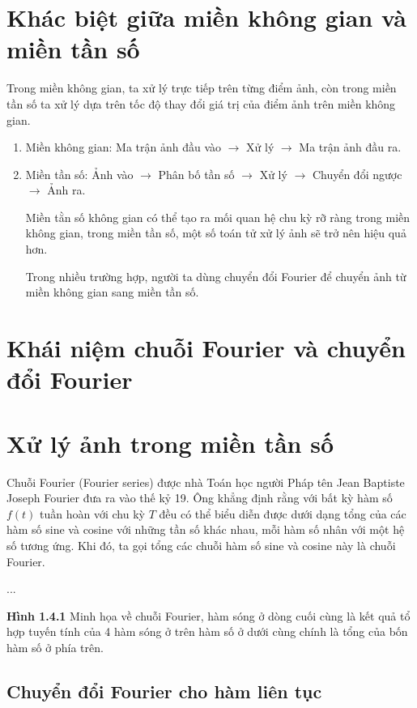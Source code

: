 \documentclass[12pt,a4paper]{report}
\numberwithin{equation}{section}
\theoremstyle{definition} %
\begin{document}
\section{Khác biệt giữa miền không gian và miền tần số}
Trong miền không gian, ta xử lý trực tiếp trên từng điểm ảnh, còn trong miền tần số ta xử lý dựa trên tốc độ thay đổi giá trị của điểm ảnh trên miền không gian.

\begin{enumerate}
    \item Miền không gian: Ma trận ảnh đầu vào $\rightarrow$ Xử lý $\rightarrow$ Ma trận ảnh đầu ra.

    \item Miền tần số: Ảnh vào $\rightarrow$ Phân bố tần số $\rightarrow$ Xử lý $\rightarrow$ Chuyển đổi ngược $\rightarrow$ Ảnh ra.

    Miền tằn số không gian có thể tạo ra mối quan hệ chu kỳ rỡ ràng trong miền không gian, trong miền tần số, một số toán tử xử lý ảnh sẽ trở nên hiệu quả hơn.

    Trong nhiều trường hợp, người ta dùng chuyển đổi Fourier để chuyển ảnh từ miền không gian sang miền tần số.
\end{enumerate}
\section{Khái niệm chuỗi Fourier và chuyển đổi Fourier}
\section{Xử lý ảnh trong miền tần số}
     Chuỗi Fourỉer (Fourier series) được nhà Toán học người Pháp tên Jean Baptiste Joseph Fourier đưa ra vào thế kỷ 19. Ông khẳng định rằng với bất kỳ hàm số $f(t)$ tuần hoàn với chu kỳ $T$ đều có thể biểu diễn được dưới dạng tổng của các hàm số sine và cosine với những tần số khác nhau, mỗi hàm số nhân với một hệ số tương ứng. Khi đó, ta gọi tổng các chuỗi hàm số sine và cosine này là chuỗi Fourier.

    ...

    \textbf{Hình 1.4.1} Minh họa về chuỗi Fourier, hàm sóng ở dòng cuối cùng là kết quả tổ hợp tuyến tính của 4 hàm sóng ở trên hàm số ở dưới cùng chính là tổng của bốn hàm số ở phía trên.
\subsection{Chuyển đổi Fourier cho hàm liên tục}
\end{document}
